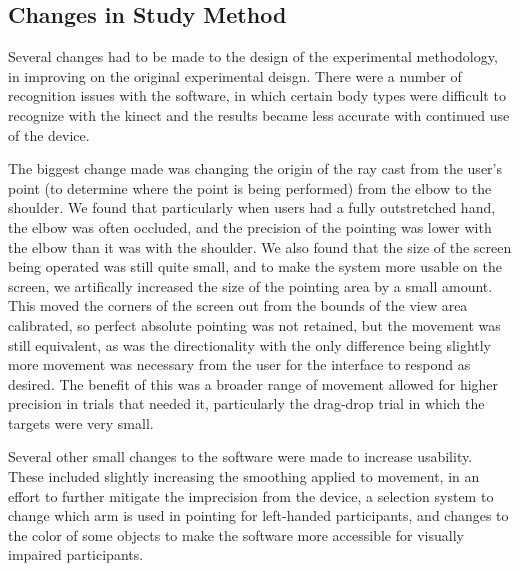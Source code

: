 \subsection{Changes in Study Method}

Several changes had to be made to the design of the experimental methodology, in improving on the original experimental deisgn. There were a number of recognition issues with the software, in which certain body types were difficult to recognize with the kinect and the results became less accurate with continued use of the device. 

The biggest change made was changing the origin of the ray cast from the user's point (to determine where the point is being performed) from the elbow to the shoulder. We found that particularly when users had a fully outstretched hand, the elbow was often occluded, and the precision of the pointing was lower with the elbow than it was with the shoulder. We also found that the size of the screen being operated was still quite small, and to make the system more usable on the screen, we artifically increased the size of the pointing area by a small amount. This moved the corners of the screen out from the bounds of the view area calibrated, so perfect absolute pointing was not retained, but the movement was still equivalent, as was the directionality with the only difference being slightly more movement was necessary from the user for the interface to respond as desired. The benefit of this was a broader range of movement allowed for higher precision in trials that needed it, particularly the drag-drop trial in which the targets were very small.

Several other small changes to the software were made to increase usability. These included slightly increasing the smoothing applied to movement, in an effort to further mitigate the imprecision from the device, a selection system to change which arm is used in pointing for left-handed participants, and changes to the color of some objects to make the software more accessible for visually impaired participants.


